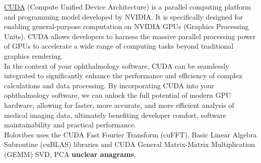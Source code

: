 \href{https://developer.nvidia.com/cuda-toolkit}{CUDA} (Compute Unified Device Architecture) is a parallel computing platform and programming model developed by NVIDIA. It is specifically designed for enabling general-purpose computation on NVIDIA GPUs (Graphics Processing Units). CUDA allows developers to harness the massive parallel processing power of GPUs to accelerate a wide range of computing tasks beyond traditional graphics rendering. \\

In the context of your ophthalmology software, CUDA can be seamlessly integrated to significantly enhance the performance and efficiency of complex calculations and data processing. By incorporating CUDA into your ophthalmology software, we can unlock the full potential of modern GPU hardware, allowing for faster, more accurate, and more efficient analysis of medical imaging data, ultimately benefiting developer comfort, software maintainability and practical performance. \\

Holovibes uses the CUDA Fast Fourier Transform (cuFFT), Basic Linear Algebra Subroutine (cuBLAS) libraries and CUDA General Matrix-Matrix Multiplication (GEMM) SVD, PCA \textbf{unclear anagrams}.\\


